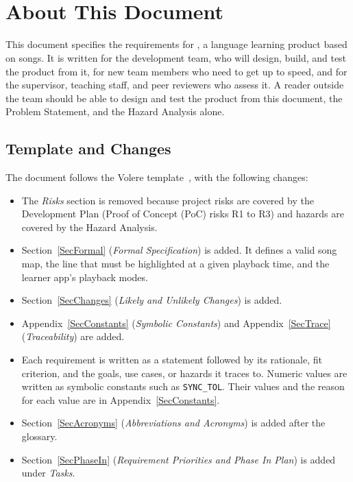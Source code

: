 \documentclass[12pt]{article}
\newcommand{\cn}[1]{\texttt{#1}}
\begin{document}
~\\

~\newpage


\section*{About This Document}

This document specifies the requirements for \progname{}, a language
learning product based on songs. It is written for the development team, who
will design, build, and test the product from it, for new team members who
need to get up to speed, and for the supervisor, teaching staff, and peer
reviewers who assess it. A reader outside the team should be able to design
and test the product from this document, the Problem Statement, and the
Hazard Analysis alone.

\subsection*{Template and Changes}

The document follows the Volere template~\cite{Volere}, with the following
changes:

\begin{itemize}
  \item The \emph{Risks} section is removed because project risks are covered by
        the Development Plan (Proof of Concept (PoC) risks R1 to R3) and
        hazards are covered by the Hazard Analysis.
  \item Section~\ref{SecFormal} (\emph{Formal Specification}) is added. It
        defines a valid song map, the line that must be highlighted at a given
        playback time, and the learner app's playback modes.
  \item Section~\ref{SecChanges} (\emph{Likely and Unlikely Changes}) is added.
  \item Appendix~\ref{SecConstants} (\emph{Symbolic Constants}) and
        Appendix~\ref{SecTrace} (\emph{Traceability}) are added.
  \item Each requirement is written as a statement followed by its rationale,
        fit criterion, and the goals, use cases, or hazards it traces to.
        Numeric values are written as symbolic constants such as
        \cn{SYNC\_TOL}. Their values and the reason for each value are in
        Appendix~\ref{SecConstants}.
  \item Section~\ref{SecAcronyms} (\emph{Abbreviations and Acronyms}) is
        added after the glossary.
  \item Section~\ref{SecPhaseIn} (\emph{Requirement Priorities and Phase In
        Plan}) is added under \emph{Tasks}.
\end{itemize}
\end{document}
